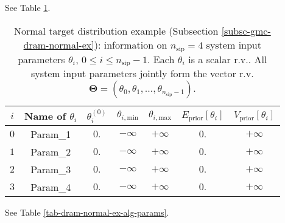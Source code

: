 See Table \ref{tab-dram-normal-ex-sys-input-params}.

\begin{table}[h!]
\begin{center}
\begin{tabular}{|c|c|c|c|c|c|c|}
\hline
 $i$      & Name of $\theta_i$ & $\theta_i^{(0)}$ & $\theta_{i,\text{min}}$ & $\theta_{i,\text{max}}$ & $E_{\text{prior}}[\theta_i]$ & $V_{\text{prior}}[\theta_i]$ \\
\hline
\hline
 $0$      & Param\_1           & $0.$             & $-\infty$               & $+\infty$               & $0.$                         & $+\infty$                    \\
\hline
 $1$      & Param\_2           & $0.$             & $-\infty$               & $+\infty$               & $0.$                         & $+\infty$                    \\
\hline
 $2$      & Param\_3           & $0.$             & $-\infty$               & $+\infty$               & $0.$                         & $+\infty$                    \\
\hline
 $3$      & Param\_4           & $0.$             & $-\infty$               & $+\infty$               & $0.$                         & $+\infty$                    \\
\hline
\end{tabular}
\caption{Normal target distribution example (Subsection \ref{subsc-gmc-dram-normal-ex}):
information on $n_{\text{sip}}=4$ system input parameters $\theta_i$, $0\leqslant i\leqslant n_{\text{sip}}-1$.
Each $\theta_i$ is a scalar r.v.. All system input parameters jointly form the vector r.v. $\boldsymbol{\Theta}=(\theta_0,\theta_1,\ldots,\theta_{n_{\text{sip}}-1})$.
}
\label{tab-dram-normal-ex-sys-input-params}
\end{center}
\end{table}

See Table \ref{tab-dram-normal-ex-alg-params}.

